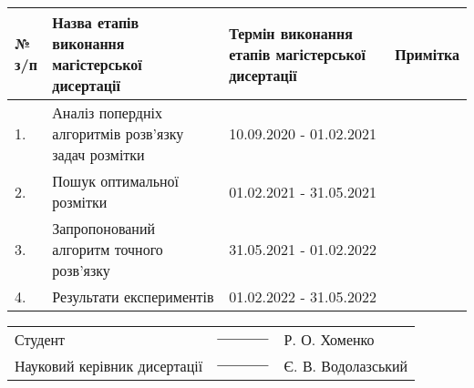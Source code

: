 \begin{table}[H]
    \centering
    \begin{tabular}{|p{0.2in} | p{2.9in} | p{2.1in} | p{0.9in}|}
        \hline
        № з/п & Назва етапів виконання магістерської дисертації            & Термін виконання етапів магістерської дисертації & Примітка \\
        \hline
        1.    & Аналіз попердніх алгоритмів розв’язку задач розмітки                                  & 10.09.2020 - 01.02.2021                          &          \\
        \hline
        2.    & Пошук оптимальної розмітки                                     & 01.02.2021 - 31.05.2021                          &          \\
        \hline
        3.    & Запропонований алгоритм точного розв’язку & 31.05.2021 - 01.02.2022                          &          \\
        \hline
        4.    & Результати експериментів                     & 01.02.2022 - 31.05.2022                          &          \\
        \hline
    \end{tabular}
\end{table}


\begin{table}[H]
    \centering
    \begin{tabular}{p{3.7in} p{1.2in} p{1.8in}}

        Студент                      & ${\text{\underline{\hspace{4em}}}}$  & Р. О. Хоменко         \\
        Науковий керівник дисертації & ${\text{\underline{\hspace{4em}}}} $ & Є. В. Водолазський
    \end{tabular}
\end{table}

\clearpage

